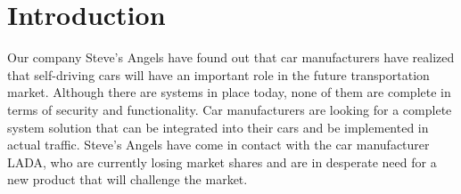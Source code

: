 \documentclass{article}
\begin{document}

\titleformat{\subsubsection}[runin]{\normalsize\bfseries}{}{0pt}{#1\quad\thesubsubsection}


\begingroup
\hypersetup{linkcolor=black}
\tableofcontents
\thispagestyle{empty}
\endgroup
\newpage
\begingroup
\hypersetup{linkcolor=black}
\listoffigures
\thispagestyle{empty}
\endgroup
\newpage
{}

\section{Introduction}
Our company Steve's Angels have found out that car manufacturers have realized that self-driving cars will have an important role in the future transportation market. Although there are systems in place today, none of them are complete in terms of security and functionality. Car manufacturers are looking for a complete system solution that can be integrated into their cars and be implemented in actual traffic. Steve's Angels have come in contact with the car manufacturer LADA, who are currently losing market shares and are in desperate need for a new product that will challenge the market. 
\end{document}
